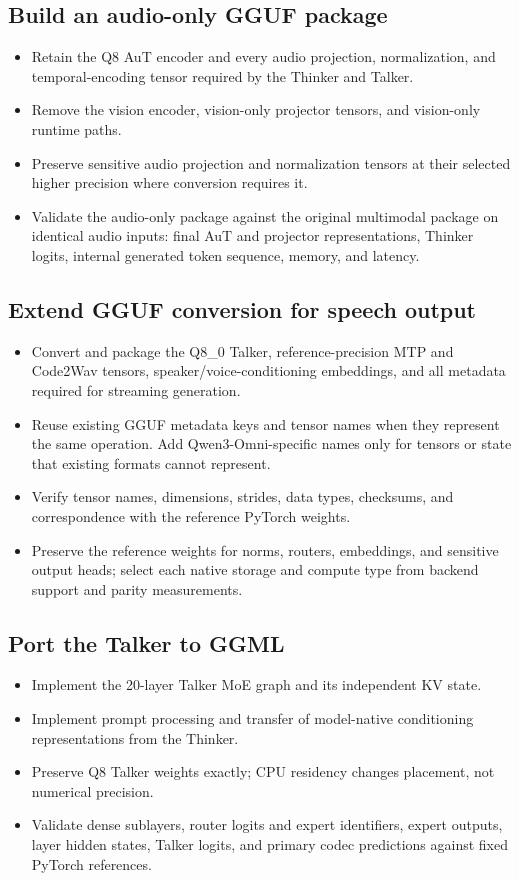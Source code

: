 \documentclass[10pt,letterpaper]{article}
\begin{document}
\subsection{Build an audio-only GGUF package}
\begin{itemize}
    \item Retain the Q8 AuT encoder and every audio projection, normalization, and temporal-encoding tensor required by the Thinker and Talker.
    \item Remove the vision encoder, vision-only projector tensors, and vision-only runtime paths.
    \item Preserve sensitive audio projection and normalization tensors at their selected higher precision where conversion requires it.
    \item Validate the audio-only package against the original multimodal package on identical audio inputs: final AuT and projector representations, Thinker logits, internal generated token sequence, memory, and latency.
\end{itemize}

\subsection{Extend GGUF conversion for speech output}
\begin{itemize}
    \item Convert and package the Q8\_0 Talker, reference-precision MTP and Code2Wav tensors, speaker/voice-conditioning embeddings, and all metadata required for streaming generation.
    \item Reuse existing GGUF metadata keys and tensor names when they represent the same operation. Add Qwen3-Omni-specific names only for tensors or state that existing formats cannot represent.
    \item Verify tensor names, dimensions, strides, data types, checksums, and correspondence with the reference PyTorch weights.
    \item Preserve the reference weights for norms, routers, embeddings, and sensitive output heads; select each native storage and compute type from backend support and parity measurements.
\end{itemize}

\subsection{Port the Talker to GGML}
\begin{itemize}
    \item Implement the 20-layer Talker MoE graph and its independent KV state.
    \item Implement prompt processing and transfer of model-native conditioning representations from the Thinker.
    \item Preserve Q8 Talker weights exactly; CPU residency changes placement, not numerical precision.
    \item Validate dense sublayers, router logits and expert identifiers, expert outputs, layer hidden states, Talker logits, and primary codec predictions against fixed PyTorch references.
\end{itemize}
\end{document}

